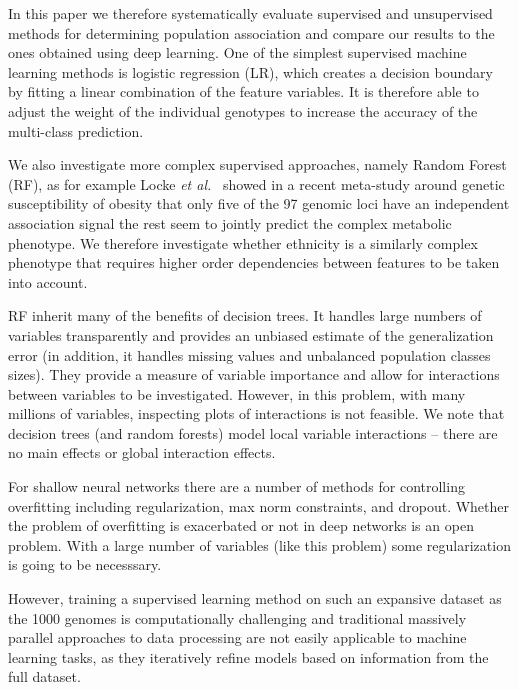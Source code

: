 \documentclass{llncs}
\begin{document}
{In this paper we therefore systematically evaluate supervised and unsupervised methods for determining population
association and compare our results to the ones obtained using deep learning.
One of the simplest supervised machine learning methods is logistic regression (LR), which creates a decision boundary
by fitting a linear combination of the feature variables.  It is therefore able to adjust the weight of the individual
genotypes to increase the accuracy of the multi-class prediction.

We also investigate more complex supervised
approaches, namely Random Forest (RF), as for example Locke {\it et al.}~\cite{Locke2015} showed in a recent meta-study
around genetic susceptibility of obesity that only five of the 97 genomic loci have an independent association signal
the rest seem to jointly predict the complex metabolic phenotype.  We therefore investigate whether ethnicity is a
similarly complex phenotype that requires higher order dependencies between features to be taken into
account. %

RF inherit many of the benefits of decision trees. It handles large numbers of variables transparently and
provides an unbiased estimate of the generalization error (in addition, it handles missing values and unbalanced
population classes sizes). They provide a measure of variable importance and allow for interactions between
variables to be investigated. However, in this problem, with many millions of variables, inspecting plots of interactions
is not feasible.  We note that decision trees (and random forests) model local variable interactions -- there are 
no main effects or global interaction effects. 

For shallow neural networks there are a number of methods for controlling overfitting including regularization, max norm
constraints, and dropout. Whether the problem of overfitting is exacerbated or not in deep networks is an open problem.
With a large number of variables (like this problem) some regularization is going to be necesssary. 

However, training a supervised learning method on such an expansive dataset as the 1000 genomes is computationally 
challenging and traditional massively parallel approaches to data processing are not easily applicable to machine learning 
tasks, as they iteratively refine models based on information from the full dataset.

}
\end{document}
